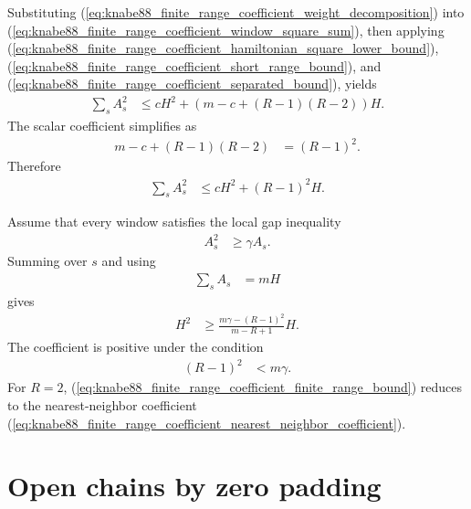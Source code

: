 \documentclass{article}
\begin{document}
Substituting
(\ref{eq:knabe88_finite_range_coefficient_weight_decomposition}) into
(\ref{eq:knabe88_finite_range_coefficient_window_square_sum}), then applying
(\ref{eq:knabe88_finite_range_coefficient_hamiltonian_square_lower_bound}),
(\ref{eq:knabe88_finite_range_coefficient_short_range_bound}), and
(\ref{eq:knabe88_finite_range_coefficient_separated_bound}), yields
\begin{align}
    \sum_s A_s^2
        &\leq
          cH^2+(m-c+(R-1)(R-2))H.
    \label{eq:knabe88_finite_range_coefficient_preliminary_upper_bound}
\end{align}
The scalar coefficient simplifies as
\begin{align}
    m-c+(R-1)(R-2)
        &=(R-1)^2.
    \label{eq:knabe88_finite_range_coefficient_scalar_simplification}
\end{align}
Therefore
\begin{align}
    \sum_s A_s^2
        &\leq cH^2+(R-1)^2H.
    \label{eq:knabe88_finite_range_coefficient_window_square_upper_bound}
\end{align}

Assume that every window satisfies the local gap inequality
\begin{align}
    A_s^2
        &\geq\gamma A_s.
    \label{eq:knabe88_finite_range_coefficient_local_gap_inequality}
\end{align}
Summing over $s$ and using
\begin{align}
    \sum_s A_s
        &=mH
    \label{eq:knabe88_finite_range_coefficient_window_sum}
\end{align}
gives
\begin{align}
    H^2
        &\geq
          \frac{m\gamma-(R-1)^2}{m-R+1}H.
    \label{eq:knabe88_finite_range_coefficient_finite_range_bound}
\end{align}
The coefficient is positive under the condition
\begin{align}
    (R-1)^2
        &<m\gamma.
    \label{eq:knabe88_finite_range_coefficient_positive_coefficient_condition}
\end{align}
For $R=2$,
(\ref{eq:knabe88_finite_range_coefficient_finite_range_bound}) reduces to
the nearest-neighbor coefficient
(\ref{eq:knabe88_finite_range_coefficient_nearest_neighbor_coefficient}).

\section{Open chains by zero padding}
\end{document}
